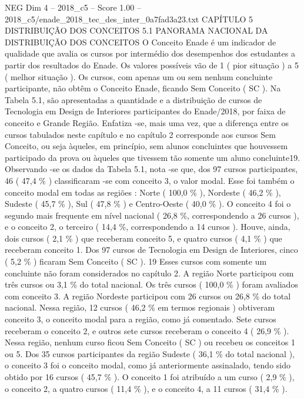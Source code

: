 \begin{textsample}{NEG Dim 4 – 2018\_c5 – Score 1.00 – 2018\_c5/enade\_2018\_tec\_des\_inter\_0a7fad3a23.txt}  \label{ex:f4_neg_138}
CAPÍTULO 5 DISTRIBUIÇÃO DOS CONCEITOS 5.1 PANORAMA NACIONAL DA DISTRIBUIÇÃO DOS CONCEITOS O Conceito Enade é um indicador de qualidade que avalia os cursos por intermédio dos desempenhos dos estudantes a partir dos resultados do Enade.
Os valores possíveis vão de 1 ( pior situação ) a 5 ( melhor situação ).
Os cursos, com apenas um ou sem nenhum concluinte participante, não obtêm o Conceito Enade, ficando Sem Conceito ( SC ).
Na Tabela 5.1, são apresentadas a quantidade e a distribuição de cursos de Tecnologia em Design de Interiores participantes do Enade/2018, por faixa de conceito e Grande Região.
Enfatiza -se, mais uma vez, que a diferença entre os cursos tabulados neste capítulo e no capítulo 2 corresponde aos cursos Sem Conceito, ou seja àqueles, em princípio, sem alunos concluintes que houvessem participado da prova ou àqueles que tivessem tão somente um aluno concluinte19.
Observando -se os dados da Tabela 5.1, nota -se que, dos 97 cursos participantes, 46 ( 47,4 \% ) classificaram -se com conceito 3, o valor modal.
Esse foi também o conceito modal em todas as regiões : Norte ( 100,0 \% ), Nordeste ( 46,2 \% ), Sudeste ( 45,7 \% ), Sul ( 47,8 \% ) e Centro-Oeste ( 40,0 \% ).
O conceito 4 foi o segundo mais frequente em nível nacional ( 26,8 \%, correspondendo a 26 cursos ), e o conceito 2, o terceiro ( 14,4 \%, correspondendo a 14 cursos ).
Houve, ainda, dois cursos ( 2,1 \% ) que receberam conceito 5, e quatro cursos ( 4,1 \% ) que receberam conceito 1.
Dos 97 cursos de Tecnologia em Design de Interiores, cinco ( 5,2 \% ) ficaram Sem Conceito ( SC ). 19 Esses cursos com somente um concluinte não foram considerados no capítulo 2.
A região Norte participou com três cursos ou 3,1 \% do total nacional.
Os três cursos ( 100,0 \% ) foram avaliados com conceito 3.
A região Nordeste participou com 26 cursos ou 26,8 \% do total nacional.
Nessa região, 12 cursos ( 46,2 \% em termos regionais ) obtiveram conceito 3, o conceito modal para a região, como já comentado.
Sete cursos receberam o conceito 2, e outros sete cursos receberam o conceito 4 ( 26,9 \% ).
Nessa região, nenhum curso ficou Sem Conceito ( SC ) ou recebeu os conceitos 1 ou 5.
Dos 35 cursos participantes da região Sudeste ( 36,1 \% do total nacional ), o conceito 3 foi o conceito modal, como já anteriormente assinalado, tendo sido obtido por 16 cursos ( 45,7 \% ).
O conceito 1 foi atribuído a um curso ( 2,9 \% ), o conceito 2, a quatro cursos ( 11,4 \% ), e o conceito 4, a 11 cursos ( 31,4 \% ).

\end{textsample}
